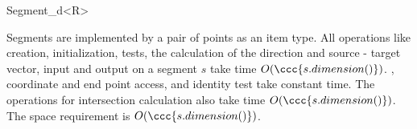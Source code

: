 \begin{ccRefClass}{Segment_d<R>}
\ccImplementation

Segments are implemented by a pair of points as an item type.  All
operations like creation, initialization, tests, the calculation of
the direction and source - target vector, input and output on a
segment $s$ take time $O(\ccc{s.dimension()})$. ,
coordinate and end point access, and identity test take constant time.
The operations for intersection calculation also take time
$O(\ccc{s.dimension()})$. The space requirement is
$O(\ccc{s.dimension()})$.
 
\end{ccRefClass}



